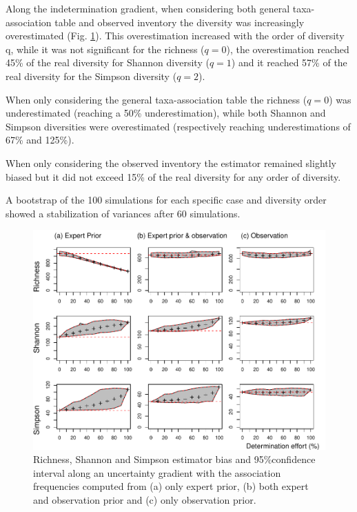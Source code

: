 \documentclass[
  11pt,
  french,
  A4paper,
  extrafontsizes,onecolumn,openright
  ]{memoir}
\begin{document}
Along the indetermination gradient, when considering both general
taxa-association table and observed inventory the diversity was
increasingly overestimated (Fig. \ref{fig:UncertGrad}). This
overestimation increased with the order of diversity q, while it was not
significant for the richness (\(q=0\)), the overestimation reached 45\%
of the real diversity for Shannon diversity (\(q = 1\)) and it reached
57\% of the real diversity for the Simpson diversity (\(q = 2\)).

When only considering the general taxa-association table the richness
(\(q=0\)) was underestimated (reaching a 50\% underestimation), while
both Shannon and Simpson diversities were overestimated (respectively
reaching underestimations of 67\% and 125\%).

When only considering the observed inventory the estimator remained
slightly biased but it did not exceed 15\% of the real diversity for any
order of diversity.

A bootstrap of the 100 simulations for each specific case and diversity
order showed a stabilization of variances after 60 simulations.

\begin{figure}

{\centering \includegraphics[width=1\linewidth]{Manuscript_files/figure-latex/UncertGrad-1} 

}

\caption{Richness, Shannon and Simpson estimator bias and 95\%confidence interval along an uncertainty gradient with the association frequencies computed from (a) only expert prior, (b) both expert and observation prior and (c) only observation prior.}\label{fig:UncertGrad}
\end{figure}
\end{document}
